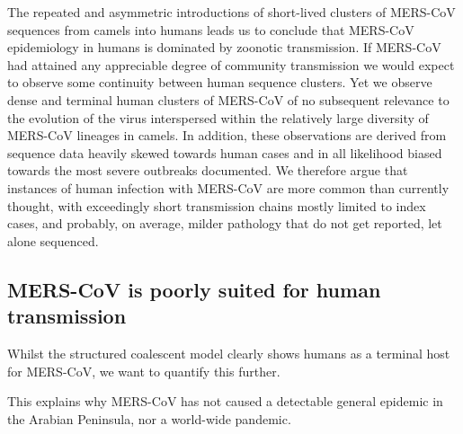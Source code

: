 \documentclass[11pt,oneside,letterpaper]{article}
\begin{document}
The repeated and asymmetric introductions of short-lived clusters of MERS-CoV sequences from camels into humans leads us to conclude that MERS-CoV epidemiology in humans is dominated by zoonotic transmission.
If MERS-CoV had attained any appreciable degree of community transmission we would expect to observe some continuity between human sequence clusters.
Yet we observe dense and terminal human clusters of MERS-CoV of no subsequent relevance to the evolution of the virus interspersed within the relatively large diversity of MERS-CoV lineages in camels.
In addition, these observations are derived from sequence data heavily skewed towards human cases and in all likelihood biased towards the most severe outbreaks documented.
We therefore argue that instances of human infection with MERS-CoV are more common than currently thought, with exceedingly short transmission chains mostly limited to index cases, and probably, on average, milder pathology that do not get reported, let alone sequenced.


\subsection{MERS-CoV is poorly suited for human transmission}
Whilst the structured coalescent model clearly shows humans as a terminal host for MERS-CoV, we want to quantify this further.

This explains why MERS-CoV has not caused a detectable general epidemic in the Arabian Peninsula, nor a world-wide pandemic.

%
\end{document}
